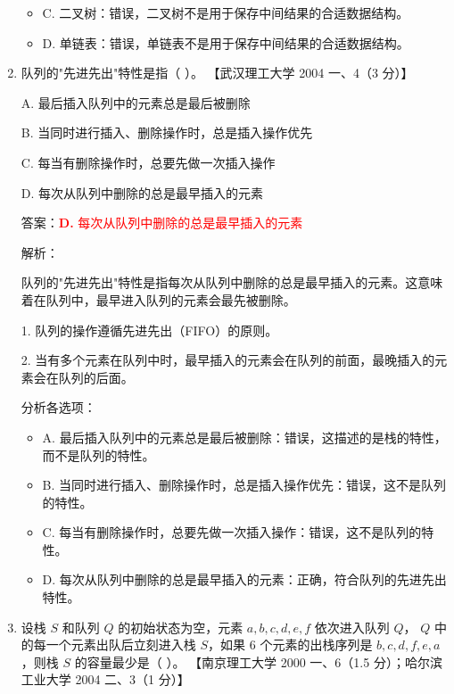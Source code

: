 \documentclass[lang=cn,newtx,10pt,scheme=chinese]{../../../elegantbook}
\begin{document}
\begin{enumerate}
\begin{itemize}
        \item C. 二叉树：错误，二叉树不是用于保存中间结果的合适数据结构。
        
        \item D. 单链表：错误，单链表不是用于保存中间结果的合适数据结构。
    \end{itemize}

    \item 队列的"先进先出"特性是指（ ）。  
    【武汉理工大学 2004 一、4（3 分）】  

    A. 最后插入队列中的元素总是最后被删除  

    B. 当同时进行插入、删除操作时，总是插入操作优先  

    C. 每当有删除操作时，总要先做一次插入操作  

    D. 每次从队列中删除的总是最早插入的元素  

    答案：\textcolor{red}{\textbf{D.} 每次从队列中删除的总是最早插入的元素}

    解析：

    队列的"先进先出"特性是指每次从队列中删除的总是最早插入的元素。这意味着在队列中，最早进入队列的元素会最先被删除。

    1. 队列的操作遵循先进先出（FIFO）的原则。

    2. 当有多个元素在队列中时，最早插入的元素会在队列的前面，最晚插入的元素会在队列的后面。

    分析各选项：
    \begin{itemize}
        \item A. 最后插入队列中的元素总是最后被删除：错误，这描述的是栈的特性，而不是队列的特性。
        
        \item B. 当同时进行插入、删除操作时，总是插入操作优先：错误，这不是队列的特性。
        
        \item C. 每当有删除操作时，总要先做一次插入操作：错误，这不是队列的特性。
        
        \item D. 每次从队列中删除的总是最早插入的元素：正确，符合队列的先进先出特性。
    \end{itemize}

    \item 设栈 $S$ 和队列 $Q$ 的初始状态为空，元素 $a, b, c, d, e, f$ 依次进入队列 $Q$，
    $Q$ 中的每一个元素出队后立刻进入栈 $S$，如果 6 个元素的出栈序列是 $b,c,d,f,e,a$，则栈 $S$ 的容量最少是（ ）。  
    【南京理工大学 2000 一、6（1.5 分）；哈尔滨工业大学 2004 二、3（1 分）】


\end{enumerate}
\end{document}
